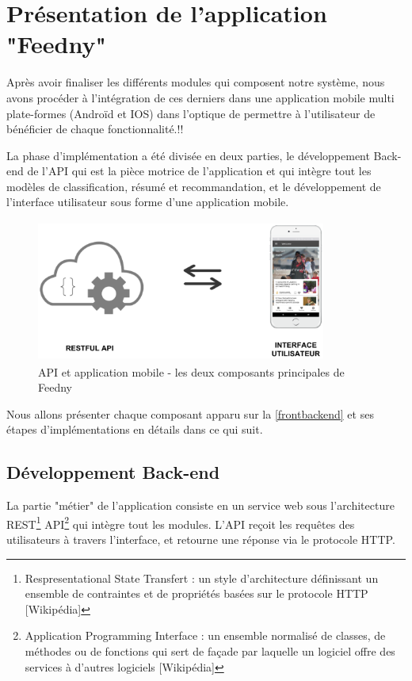 
\newpage
\section{Présentation de l'application "Feedny"}
Après avoir finaliser les différents modules qui composent notre système, nous avons procéder à l'intégration de ces derniers dans une application mobile multi plate-formes (Androïd et IOS) dans l'optique de permettre à l'utilisateur de bénéficier de chaque fonctionnalité.!!

La phase d'implémentation a été divisée en deux parties, le développement Back-end de l'API qui est la pièce motrice de l'application et qui intègre tout les modèles de classification, résumé et recommandation, et le développement de l'interface utilisateur sous forme d'une application mobile.

\begin{figure}[H]
    \centering
    \includegraphics[height=132pt,width=270pt]{img/chapter4/frontbackend.png}
    \caption{API et application mobile - les deux composants principales de \textquotedbl Feedny\textquotedbl }
    \label{frontbackend}
\end{figure}

Nous allons présenter chaque composant apparu sur la \autoref{frontbackend} et ses étapes d'implémentations en détails dans ce qui suit.

    \subsection{Développement Back-end}
    La partie "métier" de l'application consiste en un service web sous l'architecture REST\footnote{Respresentational State Transfert : un style d'architecture définissant un ensemble de contraintes et de propriétés basées sur le protocole HTTP [Wikipédia]} API\footnote{Application Programming Interface : un ensemble normalisé de classes, de méthodes ou de fonctions qui sert de façade par laquelle un logiciel offre des services à d'autres logiciels [Wikipédia]} qui intègre tout les modules. L'API reçoit les requêtes des utilisateurs à travers l'interface, et retourne une réponse via le protocole HTTP.

